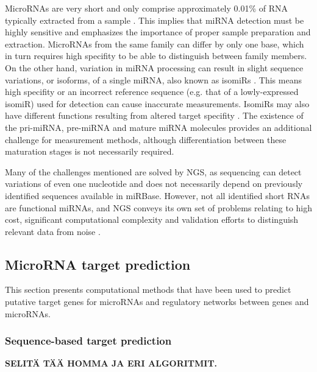 MicroRNAs are very short and only comprise approximately 0.01\% of RNA
typically extracted from a sample \citep{Dong2013}. This implies that miRNA
detection must be highly sensitive and emphasizes the importance of proper
sample preparation and extraction. MicroRNAs from the same family can differ by only one
base, which in turn requires high specifity to be able to distinguish between
family members. On the other hand, variation in miRNA processing
can result in slight sequence variations, or isoforms, of a single miRNA,
also known as isomiRs \citep{StaregaRoslan2011,Lee2010}. This means high specifity
or an incorrect reference sequence (e.g. that of a lowly-expressed isomiR) 
used for detection can cause inaccurate measurements. IsomiRs may also
have different functions resulting from altered target specifity \citep{Chugh2012}.
The existence of the pri-miRNA, pre-miRNA and mature miRNA molecules provides an additional
challenge for measurement methods, although differentiation between
these maturation stages is not necessarily required.

Many of the challenges mentioned are solved by NGS, as sequencing can detect
variations of even one nucleotide and does not necessarily depend on
previously identified sequences available in miRBase. However, not all
identified short RNAs are functional miRNAs, and NGS conveys its own set of
problems relating to high cost, significant computational complexity and
validation efforts to distinguish relevant data from noise
\citep{Chugh2012,Hunt2015}.







\subsection{MicroRNA target prediction}\label{mirna-target-prediction}

This section presents computational methods that have been used to predict
putative target genes for microRNAs and regulatory networks between genes and
microRNAs.





\subsubsection{Sequence-based target prediction}\label{sequence-based-target-
prediction}

\textbf{SELITÄ TÄÄ HOMMA JA ERI ALGORITMIT.}

